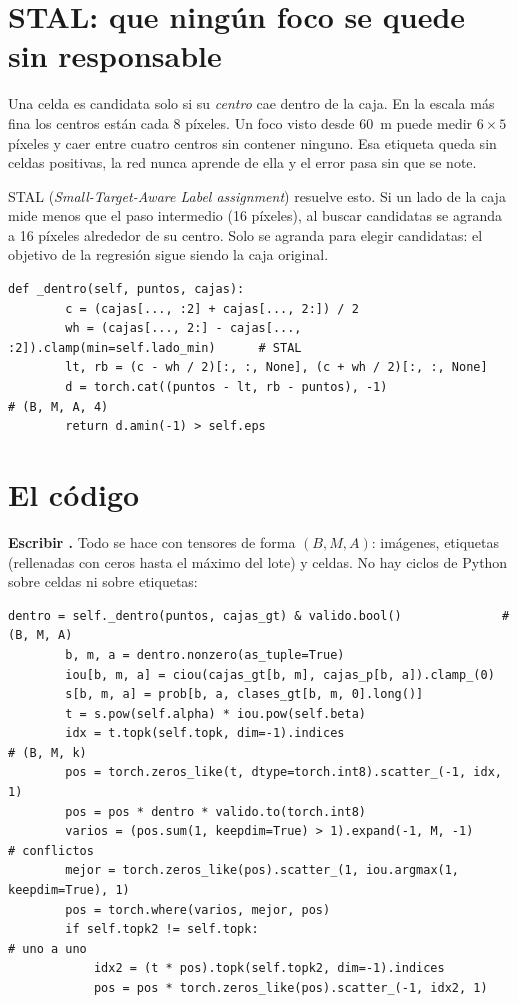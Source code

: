 \section{STAL: que ningún foco se quede sin responsable}

Una celda es candidata solo si su \emph{centro} cae dentro de la caja. En la
escala más fina los centros están cada 8 píxeles. Un foco visto desde 60~m puede
medir $6\times5$ píxeles y caer entre cuatro centros sin contener ninguno. Esa
etiqueta queda sin celdas positivas, la red nunca aprende de ella y el error pasa
sin que se note.

STAL (\emph{Small-Target-Aware Label assignment}) resuelve esto. Si un lado de la
caja mide menos que el paso intermedio (16 píxeles), al buscar candidatas se
agranda a 16 píxeles alrededor de su centro. Solo se agranda para elegir
candidatas: el objetivo de la regresión sigue siendo la caja original.

\begin{lstlisting}[style=py]
    def _dentro(self, puntos, cajas):
        c = (cajas[..., :2] + cajas[..., 2:]) / 2
        wh = (cajas[..., 2:] - cajas[..., :2]).clamp(min=self.lado_min)      # STAL
        lt, rb = (c - wh / 2)[:, :, None], (c + wh / 2)[:, :, None]
        d = torch.cat((puntos - lt, rb - puntos), -1)                        # (B, M, A, 4)
        return d.amin(-1) > self.eps
\end{lstlisting}

\section{El código}

 \textbf{Escribir .}
Todo se hace con tensores de forma $(B, M, A)$: imágenes, etiquetas (rellenadas
con ceros hasta el máximo del lote) y celdas. No hay ciclos de Python sobre
celdas ni sobre etiquetas:

\begin{lstlisting}[style=py]
        dentro = self._dentro(puntos, cajas_gt) & valido.bool()              # (B, M, A)
        b, m, a = dentro.nonzero(as_tuple=True)
        iou[b, m, a] = ciou(cajas_gt[b, m], cajas_p[b, a]).clamp_(0)
        s[b, m, a] = prob[b, a, clases_gt[b, m, 0].long()]
        t = s.pow(self.alpha) * iou.pow(self.beta)
        idx = t.topk(self.topk, dim=-1).indices                               # (B, M, k)
        pos = torch.zeros_like(t, dtype=torch.int8).scatter_(-1, idx, 1)
        pos = pos * dentro * valido.to(torch.int8)
        varios = (pos.sum(1, keepdim=True) > 1).expand(-1, M, -1)            # conflictos
        mejor = torch.zeros_like(pos).scatter_(1, iou.argmax(1, keepdim=True), 1)
        pos = torch.where(varios, mejor, pos)
        if self.topk2 != self.topk:                                          # uno a uno
            idx2 = (t * pos).topk(self.topk2, dim=-1).indices
            pos = pos * torch.zeros_like(pos).scatter_(-1, idx2, 1)
\end{lstlisting}

